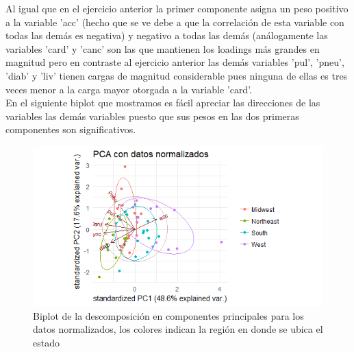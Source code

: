 \documentclass[paper=letter, fontsize=11pt]{scrartcl}
\numberwithin{equation}{section} %
\numberwithin{figure}{section} %
\numberwithin{table}{section} %
\begin{document}
\begin{enumerate}
Al igual que en el ejercicio anterior la primer componente asigna un peso positivo a la variable 'acc' (hecho que se ve debe a que la correlación de esta variable con todas las demás es negativa)  y negativo a todas las demás (análogamente las variables 'card' y 'canc' son las que mantienen los loadings más grandes en magnitud pero en contraste al ejercicio anterior las demás variables 'pul', 'pneu', 'diab' y 'liv' tienen cargas de magnitud considerable pues ninguna de ellas es tres veces menor a la carga mayor otorgada a la variable 'card'.\\
En el siguiente biplot que mostramos es fácil apreciar las direcciones de las variables las demás variables puesto que sus pesos en las dos primeras componentes son significativos.
\FloatBarrier
\begin{figure}[H]
  \begin{center}
    \includegraphics[scale=.95]{pca_con_normalizacion.png}
    \caption{Biplot de la descomposición en componentes principales para los datos normalizados, los colores indican la región en donde se ubica el estado   }
    \label{fig:pca_sin}
  \end{center}
\end{figure}


\end{enumerate}
\end{document}
